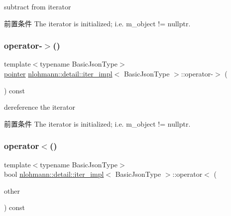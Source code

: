 subtract from iterator 

\begin{DoxyPrecond}{前置条件}
The iterator is initialized; i.\+e. {\ttfamily m\+\_\+object != nullptr}. 
\end{DoxyPrecond}
\mbox{\label{classnlohmann_1_1detail_1_1iter__impl_a6da3d2b34528aff328f3dcb513076dec}} 
\subsubsection{\texorpdfstring{operator-\/$>$()}{operator->()}}
{\footnotesize\ttfamily template$<$typename Basic\+Json\+Type$>$ \\
\mbox{\hyperlink{classnlohmann_1_1detail_1_1iter__impl_a69e52f890ce8c556fd68ce109e24b360}{pointer}} \mbox{\hyperlink{classnlohmann_1_1detail_1_1iter__impl}{nlohmann\+::detail\+::iter\+\_\+impl}}$<$ Basic\+Json\+Type $>$\+::operator-\/$>$ (\begin{DoxyParamCaption}{ }\end{DoxyParamCaption}) const\hspace{0.3cm}{\ttfamily [inline]}}



dereference the iterator 

\begin{DoxyPrecond}{前置条件}
The iterator is initialized; i.\+e. {\ttfamily m\+\_\+object != nullptr}. 
\end{DoxyPrecond}
\mbox{\label{classnlohmann_1_1detail_1_1iter__impl_a0d14cd76203e00bdcef6a64a5d055cc7}} 
\subsubsection{\texorpdfstring{operator$<$()}{operator<()}}
{\footnotesize\ttfamily template$<$typename Basic\+Json\+Type$>$ \\
bool \mbox{\hyperlink{classnlohmann_1_1detail_1_1iter__impl}{nlohmann\+::detail\+::iter\+\_\+impl}}$<$ Basic\+Json\+Type $>$\+::operator$<$ (\begin{DoxyParamCaption}\item[{const \mbox{\hyperlink{classnlohmann_1_1detail_1_1iter__impl}{iter\+\_\+impl}}$<$ Basic\+Json\+Type $>$ \&}]{other }\end{DoxyParamCaption}) const\hspace{0.3cm}{\ttfamily [inline]}}



